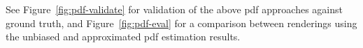 See Figure~\ref{fig:pdf-validate} for validation of the above pdf approaches against ground truth, and Figure~\ref{fig:pdf-eval} for a comparison between renderings using the unbiased and approximated pdf estimation results. 




